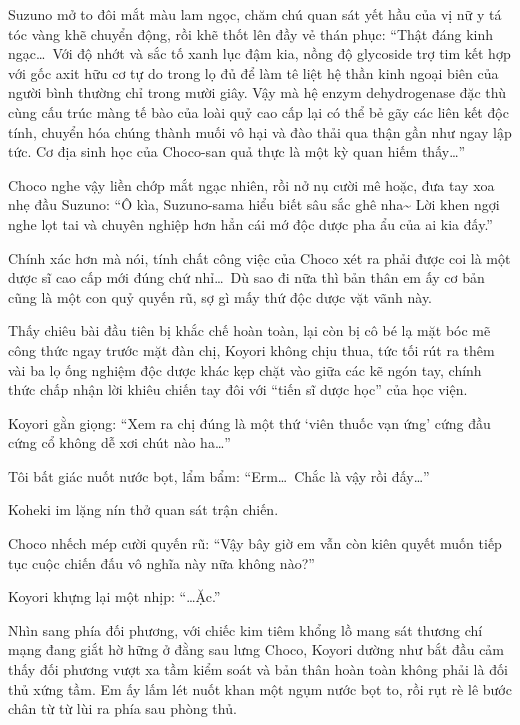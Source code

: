 \documentclass[../main.tex]{subfiles}
\begin{document}
Suzuno mở to đôi mắt màu lam ngọc, chăm chú quan sát yết hầu của vị nữ y tá tóc vàng khẽ chuyển động, rồi khẽ thốt lên đầy vẻ thán phục: ``Thật đáng kinh ngạc\dots\ Với độ nhớt và sắc tố xanh lục đậm kia, nồng độ glycoside trợ tim kết hợp với gốc axit hữu cơ tự do trong lọ đủ để làm tê liệt hệ thần kinh ngoại biên của người bình thường chỉ trong mười giây. Vậy mà hệ enzym dehydrogenase đặc thù cùng cấu trúc màng tế bào của loài quỷ cao cấp lại có thể bẻ gãy các liên kết độc tính, chuyển hóa chúng thành muối vô hại và đào thải qua thận gần như ngay lập tức. Cơ địa sinh học của Choco-san quả thực là một kỳ quan hiếm thấy\dots''

Choco nghe vậy liền chớp mắt ngạc nhiên, rồi nở nụ cười mê hoặc, đưa tay xoa nhẹ đầu Suzuno: ``Ô kìa, Suzuno-sama hiểu biết sâu sắc ghê nha\~{} Lời khen ngợi nghe lọt tai và chuyên nghiệp hơn hẳn cái mớ độc dược pha ẩu của ai kia đấy.''

Chính xác hơn mà nói, tính chất công việc của Choco xét ra phải được coi là một dược sĩ cao cấp mới đúng chứ nhỉ\dots\ Dù sao đi nữa thì bản thân em ấy cơ bản cũng là một con quỷ quyến rũ, sợ gì mấy thứ độc dược vặt vãnh này.

Thấy chiêu bài đầu tiên bị khắc chế hoàn toàn, lại còn bị cô bé lạ mặt bóc mẽ công thức ngay trước mặt đàn chị, Koyori không chịu thua, tức tối rút ra thêm vài ba lọ ống nghiệm độc dược khác kẹp chặt vào giữa các kẽ ngón tay, chính thức chấp nhận lời khiêu chiến tay đôi với ``tiến sĩ dược học'' của học viện.


Koyori gằn giọng: ``Xem ra chị đúng là một thứ `viên thuốc vạn ứng' cứng đầu cứng cổ không dễ xơi chút nào ha\dots''

Tôi bất giác nuốt nước bọt, lẩm bẩm: ``Erm\dots\ Chắc là vậy rồi đấy\dots''

Koheki im lặng nín thở quan sát trận chiến.

Choco nhếch mép cười quyến rũ: ``Vậy bây giờ em vẫn còn kiên quyết muốn tiếp tục cuộc chiến đấu vô nghĩa này nữa không nào?''

Koyori khựng lại một nhịp: ``\dots Ặc.''

Nhìn sang phía đối phương, với chiếc kim tiêm khổng lồ mang sát thương chí mạng đang giắt hờ hững ở đằng sau lưng Choco, Koyori dường như bắt đầu cảm thấy đối phương vượt xa tầm kiểm soát và bản thân hoàn toàn không phải là đối thủ xứng tầm. Em ấy lấm lét nuốt khan một ngụm nước bọt to, rồi rụt rè lê bước chân từ từ lùi ra phía sau phòng thủ.
\end{document}
